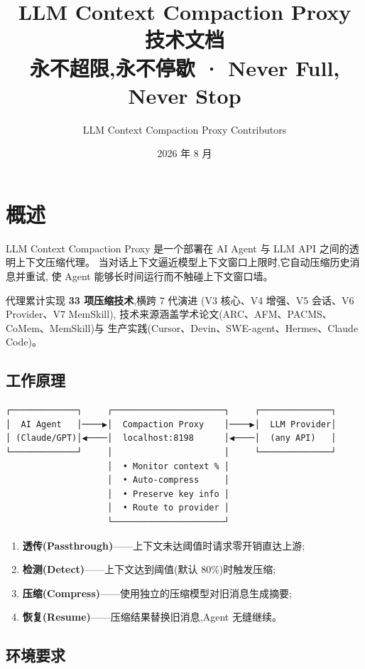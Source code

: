 \documentclass[11pt,a4paper]{article}
\title{\textbf{LLM Context Compaction Proxy\\技术文档}\\[0.3em]
\large 永不超限,永不停歇 · Never Full, Never Stop}
\author{LLM Context Compaction Proxy Contributors}
\date{2026 年 8 月}
\begin{document}
\maketitle
\tableofcontents
\newpage

\section{概述}

LLM Context Compaction Proxy 是一个部署在 AI Agent 与 LLM API 之间的透明上下文压缩代理。
当对话上下文逼近模型上下文窗口上限时,它自动压缩历史消息并重试,
使 Agent 能够长时间运行而不触碰上下文窗口墙。

代理累计实现 \textbf{33 项压缩技术},横跨 7 代演进
(V3 核心、V4 增强、V5 会话、V6 Provider、V7 MemSkill),
技术来源涵盖学术论文(ARC、AFM、PACMS、CoMem、MemSkill)与
生产实践(Cursor、Devin、SWE-agent、Hermes、Claude Code)。

\subsection{工作原理}

\begin{verbatim}
┌─────────────┐     ┌──────────────────────┐     ┌──────────────┐
│  AI Agent   │────▶│  Compaction Proxy    │────▶│  LLM Provider│
│ (Claude/GPT)│◀────│  localhost:8198      │◀────│  (any API)   │
└─────────────┘     │                      │     └──────────────┘
                    │  • Monitor context % │
                    │  • Auto-compress     │
                    │  • Preserve key info │
                    │  • Route to provider │
                    └──────────────────────┘
\end{verbatim}

\begin{enumerate}[leftmargin=2em]
  \item \textbf{透传(Passthrough)}——上下文未达阈值时请求零开销直达上游;
  \item \textbf{检测(Detect)}——上下文达到阈值(默认 80\%)时触发压缩;
  \item \textbf{压缩(Compress)}——使用独立的压缩模型对旧消息生成摘要;
  \item \textbf{恢复(Resume)}——压缩结果替换旧消息,Agent 无缝继续。
\end{enumerate}

\subsection{环境要求}
\end{document}
